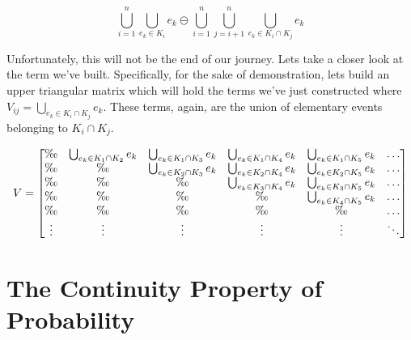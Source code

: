\documentclass{article}
\begin{document}
\[  \bigcup_{i = 1}^{n} \bigcup_{e_k \in K_i} e_k
    \ominus
    \bigcup_{i=1}^{n} \bigcup_{j = i + 1}^{n} \bigcup_{e_k \in K_i \cap K_j} e_k\]

Unfortunately, this will not be the end of our journey. Lets take a closer look at the term we've built. Specifically, for the sake of demonstration, lets build an upper triangular matrix which will hold the terms we've just constructed where \(V_{ij} = \bigcup_{e_k \in K_i \cap K_j}e_k\). These terms, again, are the union of elementary events belonging to \(K_i \cap K_j\).

\[  V =
\begin{bmatrix}
\O & \bigcup_{e_k \in K_1 \cap K_2} e_k & \bigcup_{e_k \in K_1 \cap K_3} e_k & \bigcup_{e_k \in K_1 \cap K_4} e_k & \bigcup_{e_k \in K_1 \cap K_5} e_k & \hdots\\
\O & \O & \bigcup_{e_k \in K_2 \cap K_3} e_k & \bigcup_{e_k \in K_2 \cap K_4} e_k & \bigcup_{e_k \in K_2 \cap K_5} e_k & \hdots \\
\O & \O & \O & \bigcup_{e_k \in K_3 \cap K_4}e_k & \bigcup_{e_k \in K_3 \cap K_5}e_k & \hdots \\
\O & \O & \O & \O & \bigcup_{e_k \in K_4 \cap K_5}e_k & \hdots \\
\O & \O & \O & \O & \O & \hdots\\
\vdots & \vdots & \vdots & \vdots & \vdots & \ddots
\end{bmatrix}
\]



\section{The Continuity Property of Probability}
\end{document}
